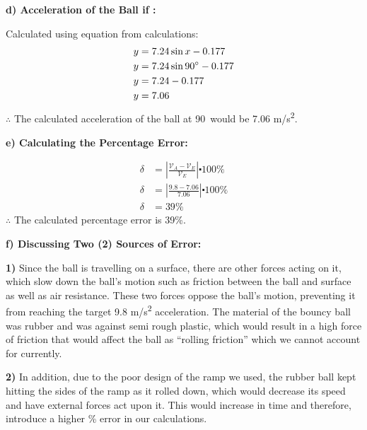 \documentclass[12pt,letterpaper]{article}
\newcommand\tab[1][1cm]{\hspace*{#1}}
\begin{document}
\vspace{8mm}
\noindent
\textbf{\tab d) Acceleration of the Ball if \textdegree:}

\noindent
\tab Calculated using equation from calculations:
\vspace{-4mm}
\[
  \begin{aligned}
    y & =7.24 \sin x-0.177          \\
    y & =7.24 \sin 90\degree -0.177 \\
    y & =7.24 - 0.177               \\
    y & =7.06
  \end{aligned}
\]
\vspace{-8mm}
\noindent
\tab $\therefore$ The calculated acceleration of the ball at 90\textdegree\ would be 7.06 m/s\textsuperscript{2}.

\vspace{12mm}
\noindent
\textbf{\tab e) Calculating the Percentage Error:}

\[
  \begin{aligned}
    \delta & = \left\lvert \frac{ \mathcal{V}_{A} - \mathcal{V}_{E} }{\mathcal{V}_{E}} \right\rvert \centerdot 100\% \\
    \delta & = \left\lvert \frac{9.8-7.06}{7.06}\right\rvert \centerdot 100\%                                        \\
    \delta & = 39\%
  \end{aligned}
\]
\vspace{-12mm}
\noindent
\tab $\therefore$ The calculated percentage error is 39\%.

\newpage

\noindent
\textbf{\tab f) Discussing Two (2) Sources of Error:}

\noindent
\tab \textbf{1)} Since the ball is travelling on a surface, there are other forces acting on it, which \tab slow down the ball’s motion such as friction between the ball and surface as well as \tab air resistance. These two forces oppose the ball’s motion, preventing it from reaching \tab the target 9.8 m/s\textsuperscript{2} acceleration. The material of the bouncy ball was rubber and was \tab against semi rough plastic, which would result in a high force of friction that would \tab affect the ball as “rolling friction” which we cannot account for currently.

\vspace{4mm}

\noindent
\tab \textbf{2)} In addition, due to the poor design of the ramp we used, the rubber ball kept \tab hitting the sides of the ramp as it rolled down, which would decrease its speed and \tab have external forces act upon it. This would increase in time and therefore, introduce \tab a higher \% error in our calculations.
\end{document}
